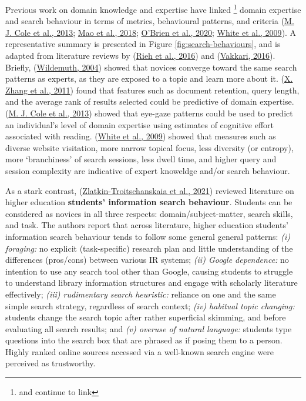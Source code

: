 \documentclass[letterpaper, nobind]{templates/ociamthesis}
\begin{document}
Previous work on domain knowledge and expertise have linked \footnote{and continue to link} domain
expertise and search behaviour in terms of metrics, behavioural
patterns, and criteria
(\protect\hyperlink{ref-cole2013inferring}{M. J. Cole et al., 2013}; \protect\hyperlink{ref-133}{Mao et al., 2018}; \protect\hyperlink{ref-o2020role}{O'Brien et al., 2020}; \protect\hyperlink{ref-white2009characterizing}{White et al., 2009}). A
representative summary is presented in Figure \ref{fig:search-behaviours}, and is adapted from literature
reviews by (\protect\hyperlink{ref-rieh2016searching}{Rieh et al., 2016}) and (\protect\hyperlink{ref-vakkari2016searching}{Vakkari, 2016}). Briefly,
(\protect\hyperlink{ref-wildemuth2004effects}{Wildemuth, 2004}) showed that novices converge toward the same
search patterns as experts, as they are exposed to a topic and learn
more about it. (\protect\hyperlink{ref-zhang2011predicting}{X. Zhang et al., 2011}) found that features such as
document retention, query length, and the average rank of results
selected could be predictive of domain expertise. (\protect\hyperlink{ref-cole2013inferring}{M. J. Cole et al., 2013})
showed that eye-gaze patterns could be used to predict an individual's
level of domain expertise using estimates of cognitive effort associated
with reading. (\protect\hyperlink{ref-white2009characterizing}{White et al., 2009}) showed that measures such as
diverse website visitation, more narrow topical focus, less diversity
(or entropy), more `branchiness' of search sessions, less dwell time,
and higher query and session complexity are indicative of expert
knoweldge and/or search behaviour.

As a stark contrast, (\protect\hyperlink{ref-zlatkin2021students}{Zlatkin-Troitschanskaia et al., 2021}) reviewed literature on
higher education \textbf{students' information search behaviour}. Students
can be considered as novices in all three respects:
domain/subject-matter, search skills, and task. The authors report that
across literature, higher education students' information search
behaviour tends to follow some general general patterns: \emph{(i) foraging:}
no explicit (task-specific) research plan and little understanding of
the differences (pros/cons) between various IR systems; \emph{(ii) Google
dependence:} no intention to use any search tool other than Google,
causing students to struggle to understand library information
structures and engage with scholarly literature effectively; \emph{(iii)
rudimentary search heuristic:} reliance on one and the same simple
search strategy, regardless of search context; \emph{(iv) habitual topic
changing:} students change the search topic after rather superficial
skimming, and before evaluating all search results; and \emph{(v) overuse of
natural language:} students type questions into the search box that are
phrased as if posing them to a person. Highly ranked online sources
accessed via a well-known search engine were perceived as trustworthy.
\end{document}
